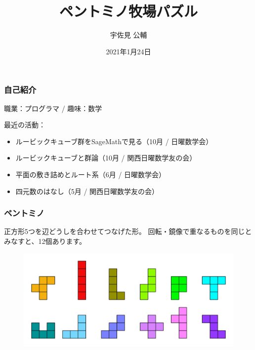 \documentclass{beamer}
\title{ペントミノ牧場パズル}
\author{宇佐見 公輔}
\date{2021年1月24日}
\begin{document}
\maketitle

\begin{frame}
    \frametitle{自己紹介}

    職業：プログラマ / 趣味：数学

    \bigskip

    最近の活動：
    \begin{itemize}
        \item ルービックキューブ群をSageMathで見る（10月 / 日曜数学会）
        \item ルービックキューブと群論（10月 / 関西日曜数学友の会）
        \item 平面の敷き詰めとルート系（6月 / 日曜数学会）
        \item 四元数のはなし（5月 / 関西日曜数学友の会）
    \end{itemize}
\end{frame}

\begin{frame}
    \frametitle{ペントミノ}

    正方形5つを辺どうしを合わせてつなげた形。
    回転・鏡像で重なるものを同じとみなすと、12個あります。

    \begin{figure}
        \includegraphics[scale=0.25]{images/Pentomino.png}
    \end{figure}
\end{frame}
\end{document}
